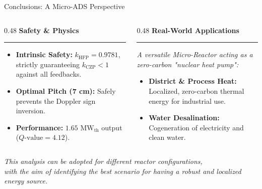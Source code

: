 \documentclass[aspectratio=169]{beamer}
\begin{document}
\begin{frame}{Conclusions: A Micro-ADS Perspective}
    
    \vspace{0.2cm}
    
    \begin{columns}[T]
        \begin{column}{0.48\textwidth}
            {\large \textcolor{blue!80!black}{\textbf{Safety \& Physics}}}
            \vspace{0.1cm}
            \hrule
            \vspace{0.3cm}
            \begin{itemize}
                \item \textbf{Intrinsic Safety:} $k_{\text{HFP}} = 0.9781$, strictly guaranteeing $k_{\text{CZP}} < 1$ against all feedbacks.
                \item \textbf{Optimal Pitch (7 cm):} Safely prevents the Doppler sign inversion.
                \item \textbf{Performance:} $1.65\text{ MW}_{\text{th}}$ output ($Q\text{-value} = 4.12$).
            \end{itemize}
        \end{column}
        
        \begin{column}{0.48\textwidth}
            {\large \textcolor{red!80!black}{\textbf{Real-World Applications}}}
            \vspace{0.1cm}
            \hrule
            \vspace{0.3cm}
            \textit{A versatile Micro-Reactor acting as a zero-carbon "nuclear heat pump":}
            \vspace{0.2cm}
            \begin{itemize}
                \item \textbf{District \& Process Heat:} Localized, zero-carbon thermal energy for industrial use.
                \item \textbf{Water Desalination:} Cogeneration of electricity and clean water.
        
            \end{itemize}
        \end{column}
    \end{columns}

    \vspace{0.3cm}
    
    \begin{center}
        \large
        \textit{This analysis can be adopted for different reactor configurations, \\ with the aim of identifying the best scenario for having a robust and localized energy source.}
       \end{center}
    
\end{frame}
\end{document}
